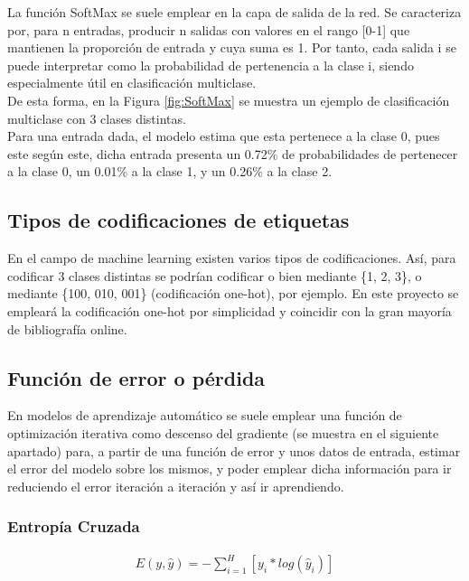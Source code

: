La función SoftMax se suele emplear en la capa de salida de la red. Se caracteriza por, para n entradas, producir n salidas con valores en el rango [0-1] que mantienen la proporción de entrada y cuya suma es 1. Por tanto, cada salida i se puede interpretar como la probabilidad de pertenencia a la clase i, siendo especialmente útil en clasificación multiclase. \cite{SoftMax_MLM} \\
De esta forma, en la Figura \ref{fig:SoftMax} se muestra un ejemplo de clasificación multiclase con 3 clases distintas. \\
Para una entrada dada, el modelo estima que esta pertenece a la clase 0, pues este según este, dicha entrada presenta un 0.72\% de probabilidades de pertenecer a la clase 0, un 0.01\% a la clase 1, y un 0.26\% a la clase 2.


\subsection{Tipos de codificaciones de etiquetas}

En el campo de machine learning existen varios tipos de codificaciones. Así, para codificar 3 clases distintas se podrían codificar o bien mediante \{1, 2, 3\}, o mediante \{100, 010, 001\} (codificación one-hot), por ejemplo. En este proyecto se empleará la codificación one-hot por simplicidad y coincidir con la gran mayoría de bibliografía online.

\subsection{Función de error o pérdida}

En modelos de aprendizaje automático se suele emplear una función de optimización iterativa como descenso del gradiente (se muestra en el siguiente apartado) para, a partir de una función de error y unos datos de entrada, estimar el error del modelo sobre los mismos, y poder emplear dicha información para ir reduciendo el error iteración a iteración y así ir aprendiendo. 

\subsubsection{Entropía Cruzada}

\begin{gather}
	E(y, \hat{y}) = - \sum_{i=1}^{H}  [y_i * log( \hat{y}_i)]
	\label{fig:loss_func_softmax}
\end{gather}

